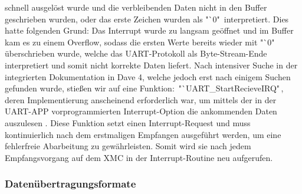 \documentclass[12pt,a4paper,bibliography=totoc,listof=totoc]{scrartcl}
\begin{document}
schnell ausgelöst wurde und die verbleibenden Daten nicht in den Buffer geschrieben wurden, oder das erste 
Zeichen wurden als "`0" \,interpretiert. Dies hatte folgenden Grund: Das Interrupt wurde zu langsam geöffnet 
und im Buffer kam es zu einem Overflow, sodass die ersten Werte bereits wieder mit "`0"\, überschrieben wurde, 
welche das UART-Protokoll als Byte-Stream-Ende interpretiert und somit nicht korrekte Daten liefert.
Nach intensiver Suche in der integrierten Dokumentation in Dave 4, welche jedoch erst nach einigem Suchen 
gefunden wurde, stießen wir auf eine Funktion:\, "`UART\_StartRecieveIRQ"\,, deren Implementierung anscheinend 
erforderlich war, um mittels der in der UART-APP vorprogrammierten Interrupt-Option die ankommenden Daten 
auszulesen \cite {infineon}
. Diese Funktion setzt einen Interrupt-Request und muss 
kontinuierlich nach dem erstmaligen Empfangen ausgeführt werden, um eine fehlerfreie Abarbeitung zu 
gewährleisten. Somit wird sie nach jedem Empfangsvorgang auf dem XMC in der Interrupt-Routine neu 
aufgerufen.

\subsubsection{Datenübertragungsformate}
\end{document}
